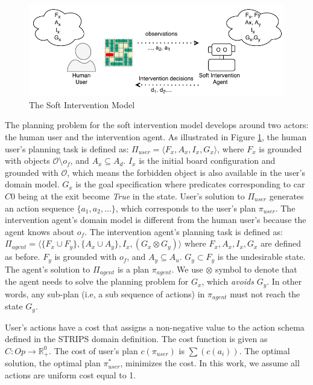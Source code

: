 \documentclass[doctor]{thesis} %
\theoremstyle{plain}
\begin{document}
\begin{figure}[!ht]
  \centering
\includegraphics{img/model.pdf}
  \caption{The Soft Intervention Model}
  \label{fig:model}
\end{figure}
The planning problem for the soft intervention model develops around two actors: the human user and the intervention agent. As illustrated in Figure \ref{fig:model}, the human user's planning task is defined as: $\Pi_{user}=\langle F_x, A_x, I_x, G_x\rangle$, where $F_x$ is grounded with objects $\mathcal{O}\setminus o_f$, and $A_x \subseteq A_d$. $I_x$ is the initial board configuration and grounded with $\mathcal{O}$, which means the forbidden object is also available in the user's domain model. $G_x$ is the goal specification where predicates corresponding to car $C0$ being at the exit become \textit{True} in the state. User's solution to $\Pi_{user}$ generates an action sequence $\lbrace a_1, a_2, \ldots \rbrace$, which corresponds to the user's plan $\pi_{user}$. The intervention agent's domain model is different from the human user's because the agent knows about $o_f$. The intervention agent's planning task is defined as: $\Pi_{agent}=\langle \lbrace F_x\cup F_y\rbrace, \lbrace A_x \cup A_y\rbrace, I_x, (G_x\otimes G_y)\rangle$ where $F_x, A_x, I_x, G_x$ are defined as before. $F_y$ is grounded with $o_f$, and $A_y \subseteq A_u$. $G_y\subset F_y$ is the undesirable state. The agent's solution to $\Pi_{agent}$ is a plan $\pi_{agent}$. We use $\otimes$ symbol to denote that the agent needs to solve the planning problem for $G_x$, which \textit{avoids} $G_y$. In other words, any sub-plan (i.e, a sub sequence of actions) in $\pi_{agent}$ must not reach the state $G_y$.

User's actions have a cost that assigns a non-negative value to the action schema defined in the STRIPS domain definition. The cost function is given as $C: Op \rightarrow \mathbb{R}^0_+$. The cost of user's plan $c(\pi_{user})$ is  $\sum(c(a_i))$. The optimal solution, the optimal plan $\pi^*_{user}$, minimizes the cost. In this work, we assume all actions are uniform cost equal to 1.
\end{document}
